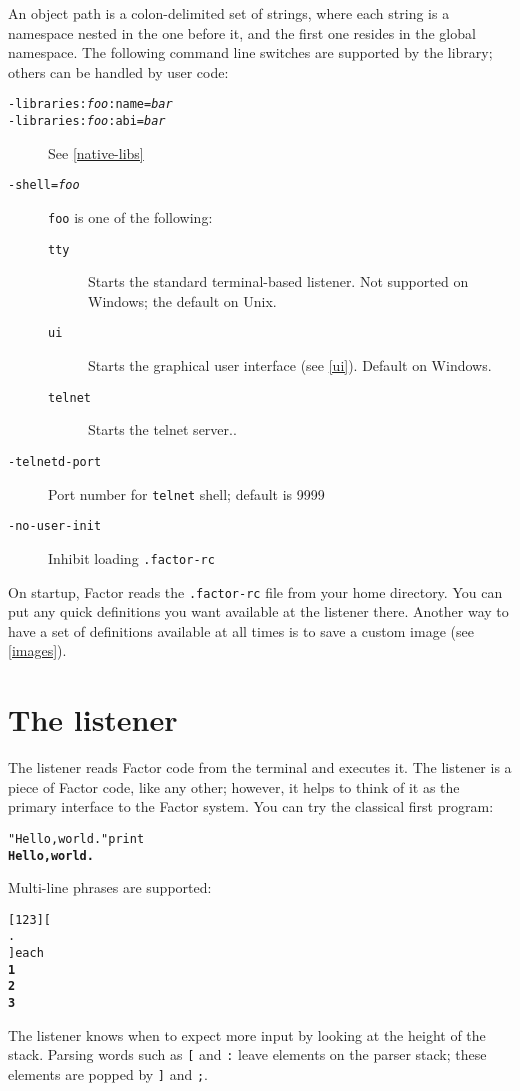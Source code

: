 \documentclass{book}
\begin{document}
An object path is a colon-delimited set of strings, where each string is a namespace nested in the one before it, and the first one resides in the global namespace. The following command line switches are supported by the library; others can be handled by user code:
\begin{description}
\item[\texttt{-libraries:\emph{foo}:name=\emph{bar}}]
\item[\texttt{-libraries:\emph{foo}:abi=\emph{bar}}] See \ref{native-libs}
\item[\texttt{-shell=\emph{foo}}] \verb|foo| is one of the following:
\begin{description}
\item[\texttt{tty}] Starts the standard terminal-based listener. Not supported on Windows; the default on Unix.
\item[\texttt{ui}] Starts the graphical user interface (see \ref{ui}). Default on Windows.
\item[\texttt{telnet}] Starts the telnet server..
\end{description}
\item[\texttt{-telnetd-port}] Port number for \verb|telnet| shell; default is 9999
\item[\texttt{-no-user-init}] Inhibit loading \verb|.factor-rc|

\end{description}

On startup, Factor reads the \texttt{.factor-rc} file from your home directory. You can put
any quick definitions you want available at the listener there. Another way to have a set of definitions available at all times is to save a custom image (see \ref{images}).

\section{The listener}\label{listener}

The listener reads Factor code from the terminal and executes it. The listener is a piece of Factor code, like any other; however, it helps to think of it as the primary interface to the Factor system. You can try the classical first program:
\begin{alltt}
  "Hello, world." print
\textbf{Hello, world.}
\end{alltt}
Multi-line phrases are supported:
\begin{alltt}
  [ 1 2 3 ] [
.
] each
\textbf{1
2
3}
\end{alltt}
The listener knows when to expect more input by looking at the height of the
stack. Parsing words such as \texttt{[} and \texttt{:} leave elements on the parser
stack; these elements are popped by \texttt{]} and \texttt{;}.
\end{document}
